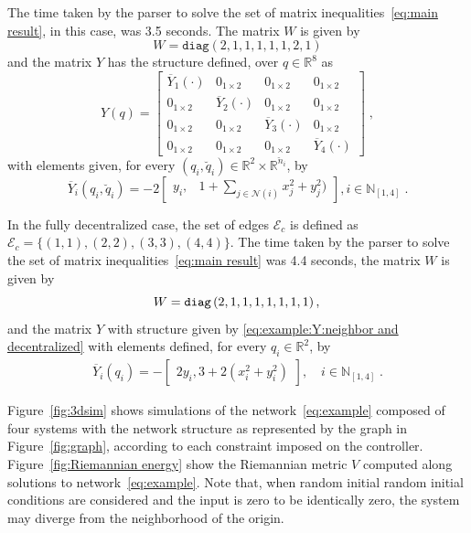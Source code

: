 \documentclass[10pt,twocolumn,twoside]{IEEEtran}
\newcounter{para}
\newcommand\mypara{\par}
\theoremstyle{plain}
\theoremstyle{definition}
\theoremstyle{remark}
\begin{document}
\mypara The time taken by the parser to solve the set of matrix inequalities~\eqref{eq:main result}, in this case, was 3.5 seconds. The matrix $W$ is given by
\begin{equation*}
		W=\mathbin{\mathtt{diag}}(2,1,1,1,1,1,2,1)
\end{equation*}
and the matrix $Y$ has the structure defined, over $q\in\mathbb{R}^8$ as
\begin{equation}\label{eq:example:Y:neighbor and decentralized}
	 Y(q)=\begin{bmatrix}
 	\overline{Y}_1(\cdot)&0_{1\times2}&0_{1\times2}&0_{1\times2}\\
 	0_{1\times2}&\overline{Y}_2(\cdot)&0_{1\times2}&0_{1\times2}\\
 	0_{1\times2}&0_{1\times2}&\overline{Y}_3(\cdot)&0_{1\times2}\\
 	0_{1\times2}&0_{1\times2}&0_{1\times2}&\overline{Y}_4(\cdot)
 \end{bmatrix}\;,
\end{equation}
with elements given, for every $(q_i,\breve{q}_i)\in\mathbb{R}^2\times\mathbb{R}^{\breve{n}_i}$, by 
\begin{equation*}
	\overline{Y}_i(q_i,\breve{q}_i)=-2\begin{bmatrix}
	y_i,&1+\sum_{j\in\mathscr{N}(i)}x_j^2+y_j^2)\end{bmatrix}, i\in\mathbb{N}_{[1,4]}\;.
\end{equation*}
 

\mypara In the fully decentralized case, the set of edges $\mathscr{E}_c$ is defined as $\mathscr{E}_c=\{(1,1),(2,2),(3,3),(4,4)\}$. The time taken by the parser to solve the set of matrix inequalities~\eqref{eq:main result} was 4.4 seconds, the matrix $W$ is given by
\begin{equation*}
 W=\mathbin{\mathtt{diag}}\left(2,1,1,1,1,1,1,1\right),\\
\end{equation*}
and the matrix $Y$ with structure given by \eqref{eq:example:Y:neighbor and decentralized} with elements defined, for every $q_i\in\mathbb{R}^2$, by 
\begin{align*}
 \overline{Y}_i(q_i)=-\begin{bmatrix}2y_i,3+2(x_i^2+y_i^2)\end{bmatrix},\quad i\in\mathbb{N}_{[1,4]}\;.
\end{align*}

\mypara Figure~\ref{fig:3dsim} shows simulations of the network~\eqref{eq:example} composed of four systems with the network structure as represented by the graph in Figure~\ref{fig:graph}, according to each constraint imposed on the controller. Figure~\ref{fig:Riemannian energy} show the Riemannian metric $V$ computed along solutions to network~\eqref{eq:example}. Note that, when random initial random initial conditions are considered and the input is zero to be identically zero, the system may diverge from the neighborhood of the origin.
\end{document}
